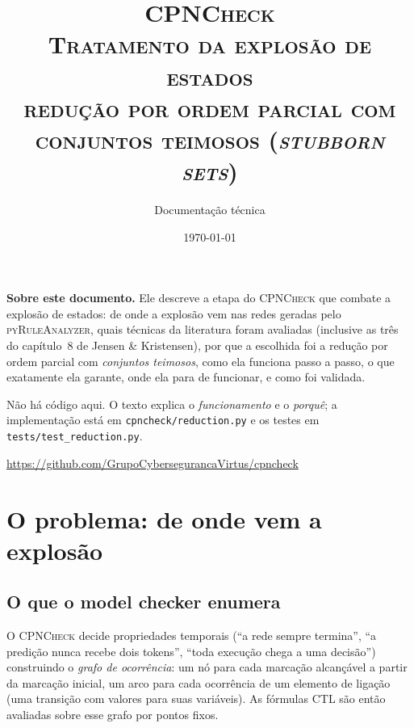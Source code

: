 \documentclass[11pt,a4paper]{report}
\title{\vspace{-1.5cm}\Huge\normalfont\scshape CPNCheck\upshape\\[6pt]
\Large Tratamento da explosão de estados\\[4pt]
\large redução por ordem parcial com conjuntos teimosos (\emph{stubborn sets})}
\author{Documentação técnica}
\date{\today}
\newcommand{\cpn}{\textsc{CPNCheck}}
\newcommand{\pyra}{\textsc{pyRuleAnalyzer}}
\newcommand{\code}[1]{\texttt{\small #1}}
\theoremstyle{definition}
\begin{document}
\maketitle
\thispagestyle{empty}

\vspace{1cm}
\begin{center}
\begin{minipage}{0.84\textwidth}
\small
\noindent\textbf{Sobre este documento.} Ele descreve a etapa do \cpn{} que
combate a explosão de estados: de onde a explosão vem nas redes geradas pelo
\pyra{}, quais técnicas da literatura foram avaliadas (inclusive as três do
capítulo~8 de Jensen \& Kristensen), por que a escolhida foi a redução por
ordem parcial com \emph{conjuntos teimosos}, como ela funciona passo a passo,
o que exatamente ela garante, onde ela para de funcionar, e como foi validada.

\vspace{6pt}
\noindent Não há código aqui. O texto explica o \emph{funcionamento} e o
\emph{porquê}; a implementação está em \code{cpncheck/reduction.py} e os
testes em \code{tests/test\_reduction.py}.
\end{minipage}
\end{center}

\vfill
\begin{center}
\small
\url{https://github.com/GrupoCybersegurancaVirtus/cpncheck}
\end{center}

\clearpage
\tableofcontents
\clearpage

\chapter{O problema: de onde vem a explosão}
\label{cap:problema}

\section{O que o model checker enumera}

O \cpn{} decide propriedades temporais (``a rede sempre termina'', ``a
predição nunca recebe dois tokens'', ``toda execução chega a uma decisão'')
construindo o \emph{grafo de ocorrência}: um nó para cada marcação alcançável a
partir da marcação inicial, um arco para cada ocorrência de um elemento de
ligação (uma transição com valores para suas variáveis). As fórmulas CTL são
então avaliadas sobre esse grafo por pontos fixos.
\end{document}
